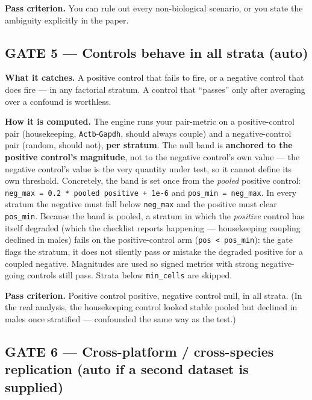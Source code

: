 \documentclass[
  11pt,
]{article}
\begin{document}
\textbf{Pass criterion.} You can rule out every non-biological scenario,
or you state the ambiguity explicitly in the paper.

\subsection{GATE 5 --- Controls behave in all strata
(auto)}\label{gate-5-controls-behave-in-all-strata-auto}

\textbf{What it catches.} A positive control that fails to fire, or a
negative control that does fire --- in any factorial stratum. A control
that ``passes'' only after averaging over a confound is worthless.

\textbf{How it is computed.} The engine runs your pair-metric on a
positive-control pair (housekeeping, \texttt{Actb}-\texttt{Gapdh},
should always couple) and a negative-control pair (random, should not),
\textbf{per stratum}. The null band is \textbf{anchored to the positive
control's magnitude}, not to the negative control's own value --- the
negative control's value is the very quantity under test, so it cannot
define its own threshold. Concretely, the band is set once from the
\emph{pooled} positive control:
\texttt{neg\_max\ =\ 0.2\ *\ \textbar{}pooled\ positive\textbar{}\ +\ 1e-6}
and \texttt{pos\_min\ =\ neg\_max}. In every stratum the negative must
fall below \texttt{neg\_max} and the positive must clear
\texttt{pos\_min}. Because the band is pooled, a stratum in which the
\emph{positive} control has itself degraded (which the checklist reports
happening --- housekeeping coupling declined in males) fails on the
positive-control arm
(\texttt{\textbar{}pos\textbar{}\ \textless{}\ pos\_min}): the gate
flags the stratum, it does not silently pass or mistake the degraded
positive for a coupled negative. Magnitudes are used so signed metrics
with strong negative-going controls still pass. Strata below
\texttt{min\_cells} are skipped.

\textbf{Pass criterion.} Positive control positive, negative control
null, in all strata. (In the real analysis, the housekeeping control
looked stable pooled but declined in males once stratified ---
confounded the same way as the test.)

\subsection{GATE 6 --- Cross-platform / cross-species replication (auto
if a second dataset is
supplied)}\label{gate-6-cross-platform-cross-species-replication-auto-if-a-second-dataset-is-supplied}
\end{document}
